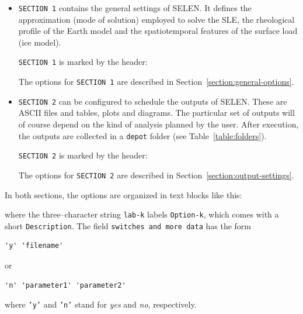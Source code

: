 \documentclass[11pt,fleqn,a4paper,titlepage]{article}
\newcommand\selens{\textsf{SELEN}}
\begin{document}
\begin{itemize}
\item  \texttt{SECTION 1}
contains the general settings of \selens. It defines the approximation (mode of solution) employed to solve the SLE, the rheological profile of the Earth model and the spatiotemporal features of the surface load (ice model). 

\texttt{SECTION 1} is marked by the header:

{\color{Cyan}{\scriptsize\begin{verbatim}
    ...
    !!!!!!!!!!!!!!!!!!!!!!!!!!!!!!!!!!!!!!!!!!!!!!!!!!!!!
    This is SECTION (1) of "config.dat": SELEN settings
    !!!!!!!!!!!!!!!!!!!!!!!!!!!!!!!!!!!!!!!!!!!!!!!!!!!!!
    ...
\end{verbatim} }}

The options for \texttt{SECTION 1} are described in Section~\ref{section:general-options}.

\item \texttt{SECTION 2} can be configured to schedule the outputs of 
\selens. These are ASCII files and tables, plots and diagrams. The particular set
of outputs will of course depend on the kind of analysis planned by the user. 
After execution, the outputs are collected in a \texttt{depot} folder
(see Table~\ref{table:folders}). 

\texttt{SECTION 2} is marked by the header:

{\color{Magenta}{\scriptsize\begin{verbatim}
    ...
    !!!!!!!!!!!!!!!!!!!!!!!!!!!!!!!!!!!!!!!!!!!!!!!!!!!!!
    This is SECTION (2) of "config.dat: SELEN outputs
    !!!!!!!!!!!!!!!!!!!!!!!!!!!!!!!!!!!!!!!!!!!!!!!!!!!!!
    ...
\end{verbatim} }}

The options for \texttt{SECTION 2} are described in Section~\ref{section:output-settings}.

\end{itemize}

\noindent In both sections, the options are organized in text blocks like this:

{\color{black}{\scriptsize\begin{verbatim}
    ...
    ====> TITLE for this block of options 
    lab-1   Option-1       Description      switches and more data                  
    lab-2   Option-2       Description               ...                                             
     ..      ...               ...                   ...
     ..      ...               ...                   ...
    lab-n   Option-n           ...                   ... 
    ...
\end{verbatim} }}
\noindent where the three--character string \texttt{lab-k} labels \texttt{Option-k}, 
which comes with a short \texttt{Description}. The field 
\texttt{switches and more data} has the form 
\begin{verbatim}
'y' 'filename' 
\end{verbatim}
\noindent or 
\begin{verbatim}
'n' 'parameter1' 'parameter2'  
\end{verbatim}
\noindent where \texttt{'y'} and \texttt{'n'} stand for \textit{yes} and \textit{no}, respectively.  
\end{document}
